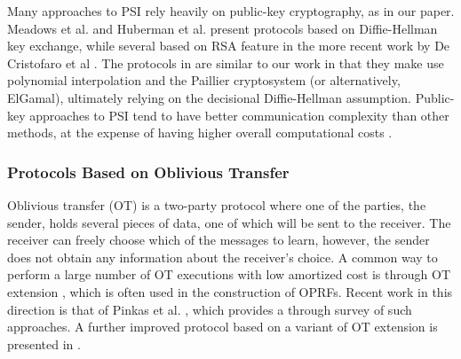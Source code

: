 Many approaches to PSI rely heavily on public-key cryptography, as
in our paper. Meadows et al. \cite{Meadows} and Huberman et al. \cite{Huberman}
present protocols based on Diffie-Hellman key exchange, while several
based on RSA feature in the more recent work by De Cristofaro et al \cite{DeCristofaro}.
The protocols in \cite{Freedman2004, Freedman2016} are similar to our work in that they make use
polynomial interpolation and the Paillier cryptosystem (or alternatively,
ElGamal), ultimately relying on the decisional Diffie-Hellman assumption.
Public-key approaches to PSI tend to have better communication complexity
than other methods, at the expense of having higher overall computational
costs \cite{Pinkas}.

\subsubsection{Protocols Based on Oblivious Transfer}

Oblivious transfer (OT) \cite{Rabin} is a two-party protocol where
one of the parties, the sender, holds several pieces of data, one
of which will be sent to the receiver. The receiver can freely choose
which of the messages to learn, however, the sender does not obtain
any information about the receiver's choice. A common way to perform
a large number of OT executions with low amortized cost is through
OT extension \cite{Pinkas}, which is often used in the construction
of OPRFs. Recent work in this direction is that of Pinkas et al. \cite{Pinkas},
which provides a through survey of such approaches. A further improved
protocol based on a variant of OT extension is presented in \cite{SpOT}. 

